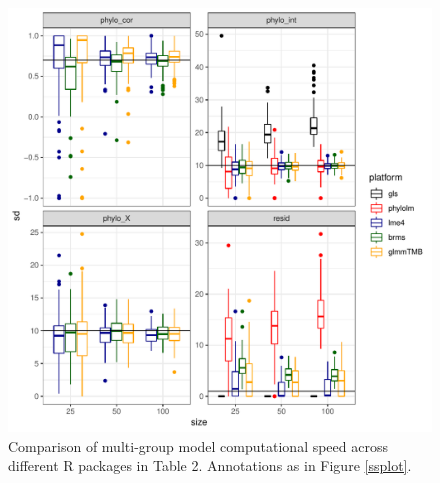 \documentclass[12pt]{article}
\begin{document}
\begin{center}
\begin{figure}[H]
  \includegraphics[scale=0.8,page=5]{./git_push/plot.Rout.pdf}
  \caption{Comparison of multi-group model computational speed across different R packages in Table 2. Annotations as in Figure \ref{ssplot}.}
  \label{msplot_time}
\end{figure}
\end{center}
\end{document}
